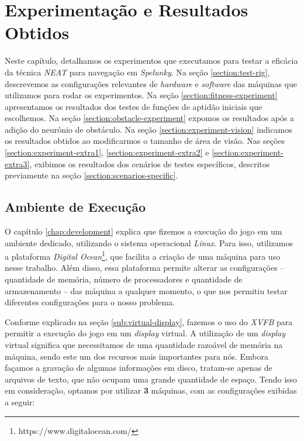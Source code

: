 \chapter{\label{chap:experimentation-and-results}Experimentação e Resultados
Obtidos}
Neste capítulo, detalhamos os experimentos que executamos para testar a eficácia
da técnica \textit{NEAT} para navegação em \textit{Spelunky}. Na seção
\ref{section:test-rig}, descrevemos as configurações relevantes de
\textit{hardware} e \textit{software} das máquinas que utilizamos para rodar os
experimentos. Na seção \ref{section:fitness-experiment} apresentamos os
resultados dos testes de funções de aptidão iniciais que escolhemos. Na seção
\ref{section:obstacle-experiment} expomos os resultados após a adição do
neurônio de obstáculo. Na seção \ref{section:experiment-vision} indicamos os
resultados obtidos ao modificarmos o tamanho de área de visão. Nas seções
\ref{section:experiment-extra1}, \ref{section:experiment-extra2} e
\ref{section:experiment-extra3}, exibimos os resultados dos cenários de testes
específicos, descritos previamente na seção \ref{section:scenarios-specific}.

\section{\label{section:test-rig}Ambiente de Execução}
O capítulo \ref{chap:development} explica que fizemos a execução do jogo em um
ambiente dedicado, utilizando o sistema operacional \textit{Linux}. Para isso,
utilizamos a plataforma \textit{Digital
Ocean}\footnote{https://www.digitalocean.com/}, que facilita a criação de uma
máquina para uso nesse trabalho. Além disso, essa plataforma permite alterar as
configurações -- quantidade de memória, número de processadores e quantidade de
armazenamento -- das máquina a qualquer momento, o que nos permitiu testar
diferentes configurações para o nosso problema.

Conforme explicado na seção \ref{sub:virtual-display}, fazemos o uso do
\textit{XVFB} para permitir a execução do jogo em um \textit{display} virtual. A
utilização de um \textit{display} virtual significa que necessitamos de uma
quantidade razoável de memória na máquina, sendo este um dos recursos mais
importantes para nós. Embora façamos a gravação de algumas informações em disco,
tratam-se apenas de arquivos de texto, que não ocupam uma grande quantidade de
espaço. Tendo isso em consideração, optamos por utilizar \textbf{3} máquinas,
com as configurações exibidas a seguir:

